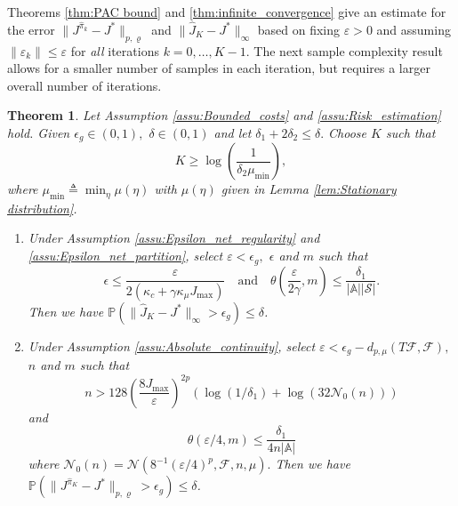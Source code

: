 \documentclass[12pt,technote,onecolumn]{IEEEtran}
\newtheorem{theorem}{Theorem}
\begin{document}
Theorems \ref{thm:PAC bound} and \ref{thm:infinite_convergence} give
an estimate for the error $\|J^{\widehat{\pi}_{k}}-J^{*}\|_{p,\varrho}$ and $\|\widehat{J}_{K}-J^{*}\|_{\infty}$ based on fixing $\varepsilon>0$
and assuming $\|\varepsilon_{k}\|\leq\varepsilon$ for \textit{all}
iterations $k=0,\ldots,K-1$. The next sample complexity result
allows for a smaller number of samples in each iteration, but requires
a larger overall number of iterations.
\begin{theorem}
	\label{thm:Sample complexity} Let Assumption \ref{assu:Bounded_costs}
	and \ref{assu:Risk_estimation} hold. Given $\epsilon_{g}\in\left(0,1\right),$
	$\delta\in\left(0,1\right)$ and let $\delta_{1}+2\delta_{2}\leq\delta.$
	Choose $K$ such that 
	$$
	K\geq\log\left(\frac{1}{\delta_{2}\mu_{\min}}\right),
	$$
	where $\mu_{\min}\triangleq\min_{\eta}\mu\left(\eta\right)$ with
	$\mu\left(\eta\right)$ given in Lemma \ref{lem:Stationary distribution}. 
	\begin{enumerate}
		\item Under Assumption \ref{assu:Epsilon_net_regularity} and \ref{assu:Epsilon_net_partition},
		select $\varepsilon<\epsilon_{g},$ $\epsilon$ and $m$ such
		that	
		\[
		\epsilon\leq\frac{\varepsilon}{2\left(\kappa_{c}+\gamma\kappa_{\mu}J_{\max}\right)}\quad\text{and}\quad\theta\left(\frac{\varepsilon}{2\gamma},m\right)\leq\frac{\delta_{1}}{\left|\mathbb{A}\right|\left|\mathcal{S}\right|}.
		\]
		Then we have $\mathbb{P}(\|\widehat{J}_{K}-J^{*}\|_{\infty}>\epsilon_{g})\leq\delta$.
		\item Under Assumption \ref{assu:Absolute_continuity}, select $\varepsilon<\epsilon_{g}-d_{p,\mu}(T\mathcal{F},\mathcal{F}),$
		$n$ and $m$ such that 		
		\[
		n>128\left(\frac{8J_{\max}}{\varepsilon}\right)^{2p}\left(\log\left(1/\delta_{1}\right)+\log\left(32\mathcal{N}_{0}\left(n\right)\right)\right)
		\]
		and
		$$
		\theta\left(\varepsilon/4,m\right)\leq\frac{\delta_{1}}{4n\left|\mathbb{A}\right|}
		$$
		where $\mathcal{N}_{0}(n)=\mathcal{N}(8^{-1}({\varepsilon}/{4})^{p},\mathcal{F},n,\mu).$
		Then we have $\mathbb{P}(\|J^{\widehat{\pi}_{K}}-J^{*}\|_{p,\varrho}>\epsilon_{g})\leq\delta$.
	\end{enumerate}
\end{theorem}
\end{document}
